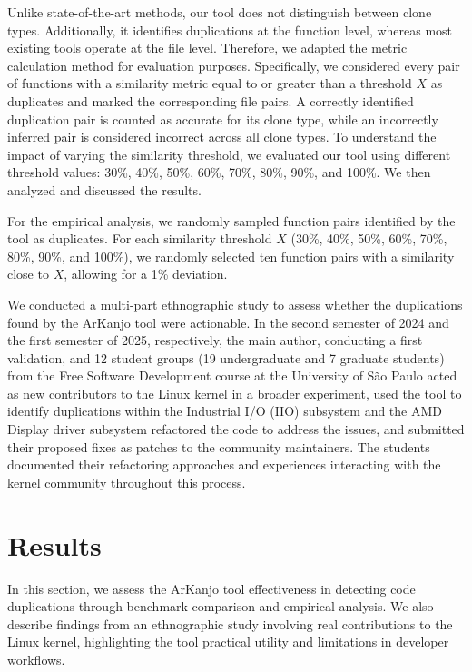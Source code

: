 \documentclass[conference]{IEEEtran}
\begin{document}
Unlike state-of-the-art methods, our tool does not distinguish between clone types. 
Additionally, it identifies duplications at the function level, whereas most existing 
tools operate at the file level.
Therefore, we adapted the metric calculation method for evaluation
purposes. Specifically, we considered every pair of functions with a similarity metric
equal to or greater than a threshold $X$ as duplicates and marked the corresponding file
pairs. A correctly identified duplication pair is counted as accurate for its clone type, while
an incorrectly inferred pair is considered incorrect across all clone types.
To understand the impact of varying the similarity threshold, we evaluated our tool using
different threshold values: 30\%, 40\%, 50\%, 60\%, 70\%, 80\%, 90\%, and 100\%. We then analyzed
and discussed the results.

For the empirical analysis, we randomly sampled function pairs identified by the tool as
duplicates. For each similarity threshold $X$ (30\%, 40\%, 50\%, 60\%, 70\%, 80\%, 90\%, and 100\%), 
we randomly selected ten function pairs with a similarity close to $X$, allowing for a 1\%
deviation.

We conducted a multi-part ethnographic study to assess whether the duplications found by the ArKanjo tool were actionable. In the second semester of 2024 and the first semester of 2025, respectively, the main author, conducting a first validation, and 12 student groups (19 undergraduate and 7 graduate students) from the Free Software Development course at the University of São Paulo acted as new contributors to the Linux kernel in a broader experiment, used the tool to identify duplications within the Industrial I/O (IIO) subsystem and the AMD Display driver subsystem refactored the code to address the issues, and submitted their proposed fixes as patches to the community maintainers. The students documented their refactoring approaches and experiences interacting with the kernel community throughout this process.


\section{Results}

In this section, we assess the ArKanjo tool effectiveness in detecting code duplications through benchmark comparison and empirical analysis. We also describe findings from an ethnographic study involving real contributions to the Linux kernel, highlighting the tool practical utility and limitations in developer workflows.
\end{document}
